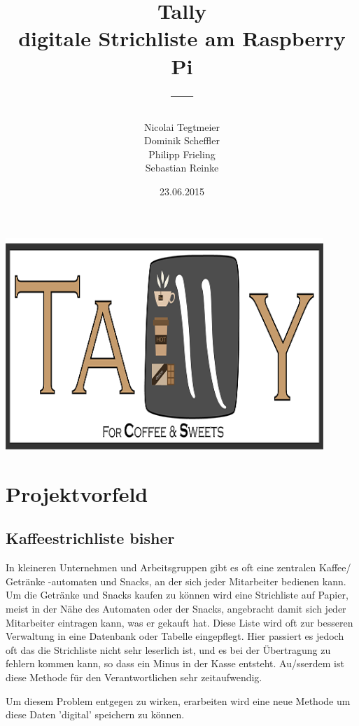 \documentclass[11pt,a4paper]{article} %
\title{\normalfont\bfseries{Tally\\ digitale Strichliste am Raspberry Pi}\\---}
\author{Nicolai Tegtmeier \\ Dominik Scheffler \\ Philipp Frieling \\ Sebastian Reinke}
\date{23.06.2015}
\begin{document}



\begin{titlepage}
	\maketitle
	\includegraphics[width=12cm]{TallyLogo.png}
\end{titlepage}

\section{Projektvorfeld}
\label{Grundlagen}


\subsection{Kaffeestrichliste bisher}

In kleineren Unternehmen und Arbeitsgruppen gibt es oft eine zentralen Kaffee/ Getr\"anke -automaten und Snacks, an der sich jeder Mitarbeiter bedienen kann. Um die Getr\"anke und Snacks kaufen zu k\"onnen wird eine Strichliste auf Papier, meist in der N\"ahe des Automaten oder der Snacks, angebracht damit sich jeder Mitarbeiter eintragen kann, was er gekauft hat. Diese Liste wird oft zur besseren Verwaltung in eine Datenbank oder Tabelle eingepflegt. Hier passiert es jedoch oft das die Strichliste nicht sehr leserlich ist, und es bei der \"Ubertragung zu fehlern kommen kann, so dass ein Minus in der Kasse entsteht. Au/ss{}erdem ist diese Methode f\"ur den Verantwortlichen sehr zeitaufwendig.
\par
Um diesem Problem entgegen zu wirken, erarbeiten wird eine neue Methode um diese Daten 'digital' speichern zu k\"onnen.
\end{document}
